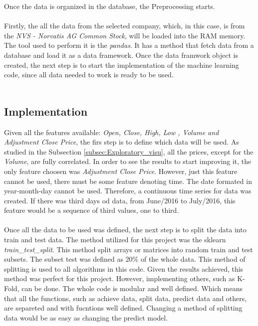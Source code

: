 Once the data is organized in the database, the Preprocessing starts.\\
\\
Firstly, the all the data from the selected company, which, in this case, is from the \textit{NVS - Norvatis AG Common Stock}, will be loaded into the RAM memory. The tool used to perform it
is the \textit{pandas}. It has a method that fetch data from a database and load it as a data framework. Once the data framwork object is created, the next step is to start the implementation 
of the machine learning code, since all data needed to work is ready to be used.\\
\\


\subsection{Implementation}
Given all the features available: \textit{Open, Close, High, Low , Volume and Adjustment Close Price}, the firs step is to define which data will be used. As studied in the Subsection \ref{subsec:Exploratory_visu},
all the prices, except for the \textit{Volume}, are fully correlated. In order to see the results to start improving it, the only feature choosen was \textit{Adjustment Close Price}. However,
just this feature cannot be used, there must be some feature denoting time. The date formated in year-month-day cannot be used. Therefore, a continuous time series for data was created. If 
there was third days od data, from June/2016 to July/2016, this feature would be a sequence of third values, one to third.\\
\\
Once all the data to be used was defined, the next step is to split the data into train and test data. The method utilized for this project was the sklearn \textit{train\_test\_split}. This method
split arrays or matrices into random train and test subsets. The subset test was defined as 20\% of the whole data. This method of splitting is used to all algorithms in this code. Given the results
achieved, this method was perfect for this project. However, implementing others, such as K-Fold, can be done. The whole code is modular and well defined. Which means that all the functions, such
as achieve data, split data, predict data and others, are separeted and with fucntions well defined. Changing a method of splitting data would be as easy as changing the predict model.\\
\\
